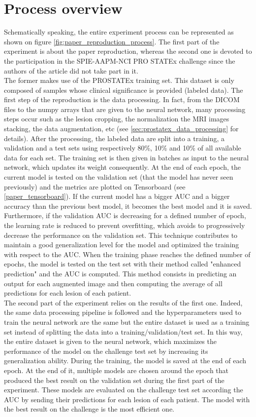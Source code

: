 \section{Process overview}
Schematically speaking, the entire experiment process can be represented as shown on figure \ref{fig:paper_reproduction_process}. The first part of the experiment is about the paper reproduction, whereas the second one is devoted to the participation in the SPIE-AAPM-NCI PRO\- STATEx challenge since the authors of the article did not take part in it.\\
The former makes use of the PROSTATEx training set. This dataset is only composed of samples whose clinical significance is provided (labeled data). The first step of the reproduction is the data processing. In fact, from the DICOM files to the numpy arrays that are given to the neural network, many processing steps occur such as the lesion cropping, the normalization the MRI images stacking, the data augmentation, etc (see \ref{sec:prostatex_data_processing} for details). After the processing, the labeled data are split into a training, a validation and a test sets using respectively 80\%, 10\% and 10\% of all available data for each set. The training set is then given in batches as input to the neural network, which updates its weight consequently. At the end of each epoch, the current model is tested on the validation set (that the model has never seen previously) and the metrics are plotted on Tensorboard (see \ref{paper_tensorboard}). If the current model has a bigger AUC and a bigger accuracy than the previous best model, it becomes the best model and it is saved. Furthermore, if the validation AUC is decreasing for a defined number of epoch, the learning rate is reduced to prevent overfitting, which avoids to progressively decrease the performance on the validation set. This technique contributes to maintain a good generalization level for the model and optimized the training with respect to the AUC. When the training phase reaches the defined number of epochs, the model is tested on the test set with their method called "enhanced prediction" and the AUC is computed. This method consists in predicting an output for each augmented image and then computing the average of all predictions for each lesion of each patient. \\
The second part of the experiment relies on the results of the first one. Indeed, the same data processing pipeline is followed and the hyperparameters used to train the neural network are the same but the entire dataset is used as a training set instead of splitting the data into a training/validation/test set. In this way, the entire dataset is given to the neural network, which maximizes the performance of the model on the challenge test set by increasing its generalization ability. During the training, the model is saved at the end of each epoch. At the end of it, multiple models are chosen around the epoch that produced the best result on the validation set during the first part of the experiment. These models are evaluated on the challenge test set according the AUC by sending their predictions for each lesion of each patient. The model with the best result on the challenge is the most efficient one.

